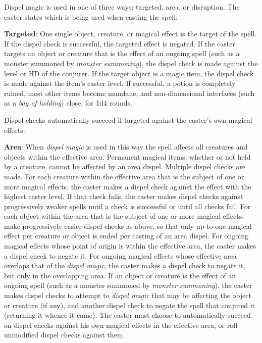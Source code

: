 \begin{multicols}{2}
Dispel magic is used in one of three ways: targeted, area, or disruption.  The caster states which is being used when casting the spell: 

\textbf{Targeted}: One single object, creature, or magical effect is the target of the spell.  If the dispel check is successful, the targeted effect is negated.  If the caster targets an object or creature that is the effect of an ongoing spell (such as a monster summoned by \textit{monster summoning}), the dispel check is made against the level or HD of the conjurer.  If the target object is a magic item, the dispel check is made against the item's caster level.  If successful, a potion is completely ruined, most other items become mundane, and non-dimensional interfaces (such as a \textit{bag of holding}) close, for 1d4 rounds.  

Dispel checks automatically succeed if targeted against the caster's own magical effects. 

\textbf{Area}: When \textit{dispel magic} is used in this way the spell affects all creatures and objects within the effective area.  Permanent magical items, whether or not held by a creature, cannot be affected by an area dispel.  Multiple dispel checks are made.  For each creature within the effective area that is the subject of one or more magical effects, the caster makes a dispel check against the effect with the highest caster level.  If that check fails, the caster makes dispel checks against progressively weaker spells until a check is successful or until all checks fail.  For each object within the area that is the subject of one or more magical effects, make progressively easier dispel checks as above, so that only up to one magical effect per creature or object is ended per casting of an area dispel.  For ongoing magical effects whose point of origin is within the effective area, the caster makes a dispel check to negate it.  For ongoing magical effects whose effective area overlaps that of the \textit{dispel magic}, the caster makes a dispel check to negate it, but only in the overlapping area.  If an object or creature is the effect of an ongoing spell (such as a monster summoned by \textit{monster summoning}), the caster makes dispel checks to attempt to \textit{dispel magic} that may be affecting the object or creature (if any), and another dispel check to negate the spell that conjured it (returning it whence it came).  The caster must choose to automatically succeed on dispel checks against his own magical effects in the effective area, or roll unmodified dispel checks against them.


\end{multicols}
